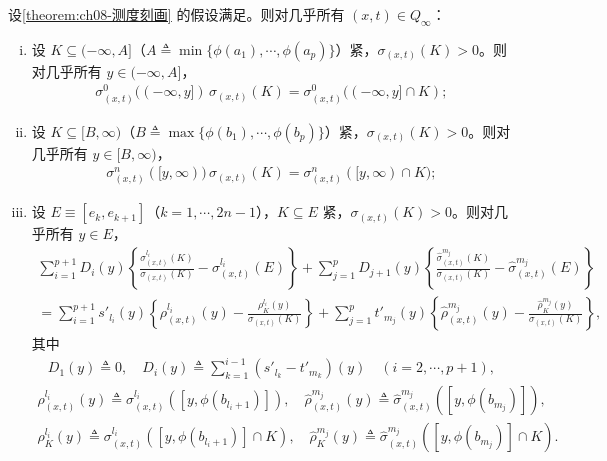 \documentclass[../../main.tex]{subfiles}%
\begin{document}
\begin{lemma}[各区间上的矩等式]\label{lemma:ch08-矩等式}
设\cref{theorem:ch08-测度刻画} 的假设满足。则对几乎所有 $(x,t)\in Q_\infty$：
\begin{enumerate}[(i)]
\item\label{item:ch08-mom-i} 设 $K\subseteq(-\infty,A]$（$A\triangleq \min\{\phi(a_1),\cdots ,\phi(a_p)\}$）紧，$\sigma_{(x,t)}(K)>0$。则对几乎所有 $y\in(-\infty,A]$，
\begin{align}
\sigma^0_{(x,t)}((-\infty,y])\,\sigma_{(x,t)}(K)=\sigma^0_{(x,t)}((-\infty,y]\cap K); \label{align:ch08-8.113}
\end{align}
\item\label{item:ch08-mom-ii} 设 $K\subseteq[B,\infty)$（$B\triangleq \max\{\phi(b_1),\cdots ,\phi(b_p)\}$）紧，$\sigma_{(x,t)}(K)>0$。则对几乎所有 $y\in[B,\infty)$，
\begin{align}
\sigma^n_{(x,t)}([y,\infty))\,\sigma_{(x,t)}(K)=\sigma^n_{(x,t)}([y,\infty)\cap K); \label{align:ch08-8.114}
\end{align}
\item\label{item:ch08-mom-iii} 设 $E\equiv[e_k,e_{k+1}]$（$k=1,\cdots ,2n-1$），$K\subseteq E$ 紧，$\sigma_{(x,t)}(K)>0$。则对几乎所有 $y\in E$，
\begin{align*}
\sum_{i=1}^{p+1}D_i(y)\left\{\frac{\sigma^{l_i}_{(x,t)}(K)}{\sigma_{(x,t)}(K)}-\sigma^{l_i}_{(x,t)}(E)\right\}
+\sum_{j=1}^p D_{j+1}(y)\left\{\frac{\widehat\sigma^{m_j}_{(x,t)}(K)}{\sigma_{(x,t)}(K)}-\widehat\sigma^{m_j}_{(x,t)}(E)\right\}\qquad\nonumber\\
=\sum_{i=1}^{p+1}s'_{l_i}(y)\left\{\rho^{l_i}_{(x,t)}(y)-\frac{\rho^{l_i}_K(y)}{\sigma_{(x,t)}(K)}\right\}
+\sum_{j=1}^p t'_{m_j}(y)\left\{\widehat\rho^{m_j}_{(x,t)}(y)-\frac{\widehat\rho^{m_j}_K(y)}{\sigma_{(x,t)}(K)}\right\},
\end{align*}
其中
\begin{align*}
D_1(y)\triangleq 0,\quad D_i(y)\triangleq \sum_{k=1}^{i-1}(s'_{l_k}-t'_{m_k})(y)\quad(i=2,\cdots ,p+1),
\end{align*}
\begin{align*}
\rho^{l_i}_{(x,t)}(y)\triangleq \sigma^{l_i}_{(x,t)}([y,\phi(b_{l_i+1})]),\quad
\widehat\rho^{m_j}_{(x,t)}(y)\triangleq \widehat\sigma^{m_j}_{(x,t)}([y,\phi(b_{m_j})]),
\end{align*}
\begin{align*}
\rho^{l_i}_K(y)\triangleq \sigma^{l_i}_{(x,t)}([y,\phi(b_{l_i+1})]\cap K),\quad
\widehat\rho^{m_j}_K(y)\triangleq \widehat\sigma^{m_j}_{(x,t)}([y,\phi(b_{m_j})]\cap K).
\end{align*}
\end{enumerate}
\end{lemma}
\end{document}
